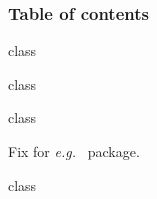 \documentclass{skdoc}
\begin{document}
	\subsubsection{Table of contents}
\begin{MacroCode}{class}
\newcommand\@pnumwidth{1.55em}
\newcommand\@tocrmarg{2em}
\newcommand\@dotsep{1.7}
\setcounter{tocdepth}{5}
\end{MacroCode}
	\begin{macro}{\tableofcontents}
\begin{MacroCode}{class}
\newcommand\tableofcontents{%
  \section*{\contentsname
    \@mkboth{\MakeUppercase\contentsname}{\MakeUppercase\contentsname}
  }%
	\vskip\baselineskip%
  \@starttoc{toc}%
}
\end{MacroCode}
	\end{macro}
	\begin{macro*}{\l@section}
	\begin{macro*}{\l@subsection}
	\begin{macro*}{\l@subsubsection}
	\begin{macro*}{\l@paragraph}
	\begin{macro*}{\l@subparagraph}
\begin{MacroCode}{class}
\newcommand*\l@section{\@dottedtocline{1}{0em}{1.3em}}
\newcommand*\l@subsection{\@dottedtocline{2}{1.3em}{2em}}
\newcommand*\l@subsubsection{\@dottedtocline{3}{3.3em}{3.15em}}
\newcommand*\l@paragraph{\@dottedtocline{4}{6.45em}{4.15em}}
\newcommand*\l@subparagraph{\@dottedtocline{5}{10.6em}{5.15em}}
\end{MacroCode}
	\end{macro*}
	\end{macro*}
	\end{macro*}
	\end{macro*}
	\end{macro*}

	Fix for \emph{e.g.}~ package.
\begin{MacroCode}{class}
\let\l@figure\@empty
\let\l@table\@empty
\end{MacroCode}
\end{document}
